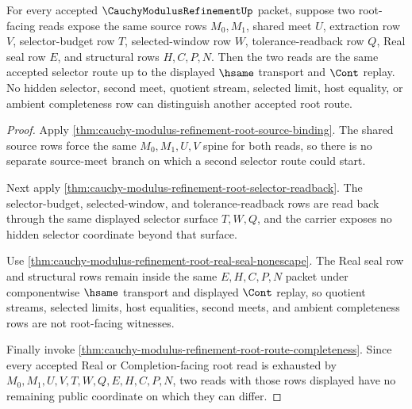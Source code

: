 \begin{theorem}
\label{thm:cauchy-modulus-refinement-shared-selector-determinacy}
For every accepted $\CauchyModulusRefinementUp$ packet, suppose two root-facing reads expose the same source rows $M_0,M_1$, shared meet $U$, extraction row $V$, selector-budget row $T$, selected-window row $W$, tolerance-readback row $Q$, Real seal row $E$, and structural rows $H,C,P,N$. Then the two reads are the same accepted selector route up to the displayed $\hsame$ transport and $\Cont$ replay. No hidden selector, second meet, quotient stream, selected limit, host equality, or ambient completeness row can distinguish another accepted root route.
\end{theorem}
\begin{proof}
Apply \autoref{thm:cauchy-modulus-refinement-root-source-binding}. The shared source rows force the same $M_0,M_1,U,V$ spine for both reads, so there is no separate source-meet branch on which a second selector route could start.

Next apply \autoref{thm:cauchy-modulus-refinement-root-selector-readback}. The selector-budget, selected-window, and tolerance-readback rows are read back through the same displayed selector surface $T,W,Q$, and the carrier exposes no hidden selector coordinate beyond that surface.

Use \autoref{thm:cauchy-modulus-refinement-root-real-seal-nonescape}. The Real seal row and structural rows remain inside the same $E,H,C,P,N$ packet under componentwise $\hsame$ transport and displayed $\Cont$ replay, so quotient streams, selected limits, host equalities, second meets, and ambient completeness rows are not root-facing witnesses.

Finally invoke \autoref{thm:cauchy-modulus-refinement-root-route-completeness}. Since every accepted Real or Completion-facing root read is exhausted by $M_0,M_1,U,V,T,W,Q,E,H,C,P,N$, two reads with those rows displayed have no remaining public coordinate on which they can differ.
\end{proof}

